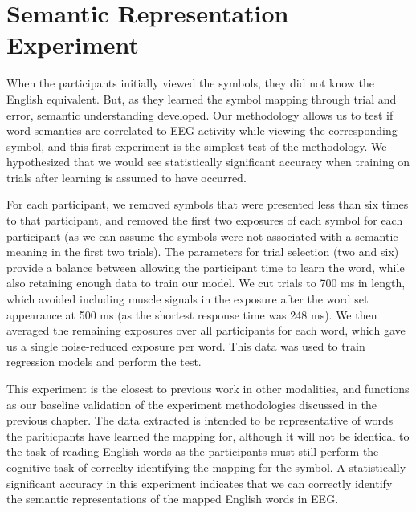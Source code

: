 \section{Semantic Representation Experiment}
\label{sec:experiments:semanticrepresentation}
When the participants initially viewed the symbols, they did not know the 
English equivalent. But, as they learned the symbol mapping through trial and 
error, semantic understanding developed. Our methodology allows us to test if 
word semantics are correlated to EEG activity while viewing the corresponding 
symbol, and this first experiment is the simplest test of the methodology. We 
hypothesized that we would see statistically significant accuracy when training 
on trials after learning is assumed to have occurred.

For each participant, we removed symbols that were presented less than six 
times to that participant, and removed the first two exposures of each symbol 
for each participant (as we can assume the symbols were not associated with a 
semantic meaning in the first two trials). The parameters for trial selection 
(two and six) provide a balance between allowing the participant time to learn 
the word, while also retaining enough data to train our model. We cut trials to 
700 ms in length, which avoided including muscle signals in the exposure after 
the word set appearance at 500 ms (as the shortest response time was 248 ms).  
We then averaged the remaining exposures over all participants for each word, 
which gave us a single noise-reduced exposure per word. This data was used to 
train regression models and perform the \tvt test. 

This experiment is the closest to previous work in other modalities, and 
functions as our baseline validation of the experiment methodologies discussed 
in the previous chapter. The data extracted is intended to be representative of 
words the pariticpants have learned the mapping for, although it will not be 
identical to the task of reading English words as the participants must still 
perform the cognitive task of correclty identifying the mapping for the symbol.  
A statistically significant \tvt accuracy in this experiment indicates that we 
can correctly identify the semantic representations of the mapped English words 
in EEG.
